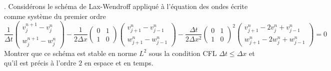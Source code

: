 \documentclass[12pt,a4paper]{article}
\begin{document}
.  Consid\'erons le sch\'ema de
Lax-Wendroff appliqu\'e \`a l'\'equation des ondes \'ecrite comme
syst\`eme du premier ordre
\begin{equation}
\displaystyle \frac{1}{\Delta t}\left(\begin{array}{c}
    v_j^{n+1}-v_{j}^n \\w_j^{n+1}-w_{j}^n \end{array}\right)-\frac{1}{2\Delta x}\left(\begin{array}{cc}
    0 & 1 \\1 & 0 \end{array}\right)
\left(\begin{array}{c} v_{j+1}^n - v_{j-1}^n \\ w_{j+1}^n -
    w_{j-1}^n\end{array}\right)-\frac{\Delta t}{2\Delta x^2} \left(\begin{array}{cc}
    0 & 1 \\1 & 0 \end{array}\right)^2 \left(\begin{array}{c} v_{j+1}^n -2v_j^n+ v_{j-1}^n \\ w_{j+1}^n -2w_j^n+ w_{j-1}^n\end{array}\right)= 0
\end{equation} 
Montrer que ce sch\'ema est stable en norme $L^2$ sous la condition CFL $\Delta
t\le \Delta x$ et qu'il est pr\'ecis \`a l'ordre $2$ en espace et en
temps.
\end{document}
